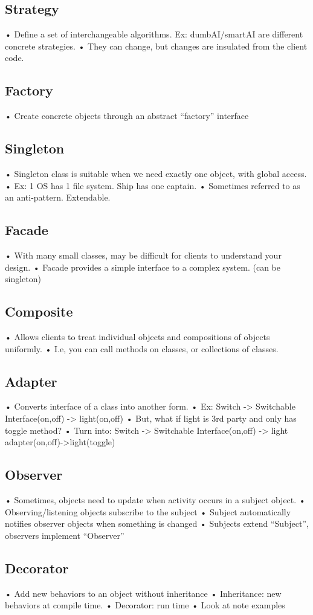 \documentclass[11pt]{article}
\begin{document}
{\subsection{Strategy}
• Define a set of interchangeable algorithms. Ex: dumbAI/smartAI are different concrete strategies.
• They can change, but changes are insulated from the client code.
\subsection{Factory}
• Create concrete objects through an abstract “factory” interface
\subsection{Singleton}
• Singleton class is suitable when we need exactly one object, with global access.
• Ex: 1 OS has 1 file system. Ship has one captain.
• Sometimes referred to as an anti-pattern. Extendable.
\subsection{Facade}
• With many small classes, may be difficult for clients to understand your design.
• Facade provides a simple interface to a complex system. (can be singleton)
\subsection{Composite}
• Allows clients to treat individual objects and compositions of objects uniformly.
• I.e, you can call methods on classes, or collections of classes.
\subsection{Adapter}
• Converts interface of a class into another form.
• Ex: Switch -> Switchable Interface(on,off) -> light(on,off)
• But, what if light is 3rd party and only has toggle method?
• Turn into: Switch -> Switchable Interface(on,off) -> light adapter(on,off)->light(toggle)
\subsection{Observer}
• Sometimes, objects need to update when activity occurs in a subject object.
• Observing/listening objects subscribe to the subject
• Subject automatically notifies observer objects when something is changed
• Subjects extend “Subject”, observers implement “Observer”
\subsection{Decorator}
• Add new behaviors to an object without inheritance
• Inheritance: new behaviors at compile time.
• Decorator: run time
• Look at note examples
}
\end{document}
